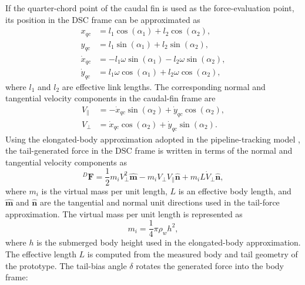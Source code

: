 \documentclass{uhcoethesis}
\begin{document}
If the quarter-chord point of the caudal fin is used as the force-evaluation point, its position in the DSC frame can be approximated as
\begin{equation}
    \begin{aligned}
        x_{qc} &= l_1\cos(\alpha_1) + l_2\cos(\alpha_2), \\
        y_{qc} &= l_1\sin(\alpha_1) + l_2\sin(\alpha_2), \\
        \dot{x}_{qc} &= -l_1\omega\sin(\alpha_1)-l_2\omega\sin(\alpha_2), \\
        \dot{y}_{qc} &= l_1\omega\cos(\alpha_1)+l_2\omega\cos(\alpha_2),
    \end{aligned}
    \label{eq:ch2_qc_position}
\end{equation}
where $l_1$ and $l_2$ are effective link lengths. The corresponding normal and tangential velocity components in the caudal-fin frame are
\begin{equation}
    \begin{aligned}
        V_{\parallel} &=
        -\dot{x}_{qc}\sin(\alpha_2) + \dot{y}_{qc}\cos(\alpha_2), \\
        V_{\perp} &=
        \dot{x}_{qc}\cos(\alpha_2) + \dot{y}_{qc}\sin(\alpha_2).
    \end{aligned}
    \label{eq:ch2_cf_velocity}
\end{equation}
Using the elongated-body approximation adopted in the pipeline-tracking model \cite{Wang2013,Lighthill1971}, the tail-generated force in the DSC frame is written in terms of the normal and tangential velocity components as
\begin{equation}
    {}^{D}\mathbf{F}
    =
    \frac{1}{2}m_i V_{\perp}^{2}\hat{\mathbf{m}}
    - m_i V_{\perp}V_{\parallel}\hat{\mathbf{n}}
    + m_i L\dot{V}_{\perp}\hat{\mathbf{n}},
    \label{eq:ch2_tail_force_d}
\end{equation}
where $m_i$ is the virtual mass per unit length, $L$ is an effective body length, and $\hat{\mathbf{m}}$ and $\hat{\mathbf{n}}$ are the tangential and normal unit directions used in the tail-force approximation. The virtual mass per unit length is represented as
\begin{equation}
    m_i = \frac{1}{4}\pi\rho_w h^2 ,
    \label{eq:ch2_virtual_mass}
\end{equation}
where $h$ is the submerged body height used in the elongated-body approximation. The effective length $L$ is computed from the measured body and tail geometry of the prototype. The tail-bias angle $\delta$ rotates the generated force into the body frame:
\end{document}
